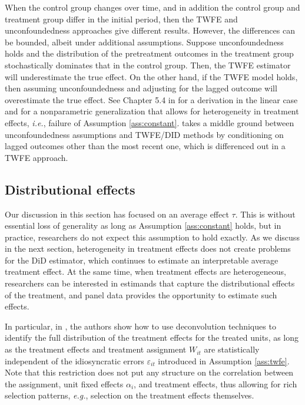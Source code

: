 \documentclass[letterpaper,12pt,leqno]{article}
\begin{document}
When the control group changes over time, and in addition the control group and treatment group differ in the initial period, then the TWFE and unconfoundedness approaches give different results. However, the differences can be bounded, albeit under additional assumptions.  Suppose unconfoundedness holds and the distribution of the pretreatment outcomes in the treatment group stochastically dominates that in the control group. Then, the TWFE estimator will underestimate the true effect. On the other hand, if the TWFE model holds, then assuming unconfoundedness and adjusting for the lagged outcome will overestimate the true effect.  See Chapter 5.4 in \cite{angristpischke} for a derivation in the linear case and 
\cite{ding2019bracketing} for a nonparametric generalization that allows for heterogeneity in treatment effects, {\it i.e.}, failure of Assumption \ref{ass:constant}. 
\citep{imai2021matching} takes a middle ground between unconfoundedness assumptions and TWFE/DID methods by conditioning on lagged outcomes other than the most recent one, which is differenced out in a TWFE approach.

\subsection{Distributional effects}
Our discussion in this section has focused on an average effect $\tau$.  This is without essential loss of generality as long as Assumption \ref{ass:constant} holds, but in practice, researchers do not expect this assumption to hold exactly. As we discuss in the next section, heterogeneity in treatment effects does not create problems for the DiD estimator, which continues to estimate an interpretable average treatment effect. At the same time, when treatment effects are heterogeneous, researchers can be interested in estimands that capture the distributional effects of the treatment, and panel data provides the opportunity to estimate such effects.

In particular, in \cite{bonhomme2011recovering}, the authors show how to use deconvolution techniques to identify the full distribution of the treatment effects for the treated units, as long as the treatment effects and treatment assignment $W_{it}$ are statistically independent of the idiosyncratic errors $\varepsilon_{it}$ introduced in Assumption \ref{ass:twfe}. Note that this restriction does not put any structure on the correlation between the assignment, unit fixed effects $\alpha_i$, and treatment effects, thus allowing for rich selection patterns, {\it e.g.}, selection on the treatment effects themselves. 
\end{document}
